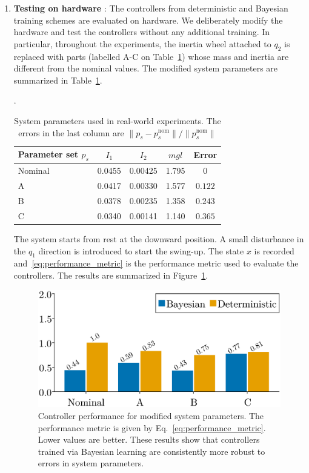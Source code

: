 \begin{enumerate}
    \item \textbf{Testing on hardware} :  
    The controllers from deterministic and Bayesian training schemes are
    evaluated on hardware. 
    We deliberately modify the hardware and test the controllers without any
    additional training.
    In particular, throughout the experiments, the inertia wheel attached to $q_2$
    is replaced with parts (labelled A-C on Table~\ref{tab:modified_params}) whose
    mass and inertia are different from the nominal values.
    The modified system parameters are summarized in
    Table~\ref{tab:modified_params}.
    \begin{table}[tb]
      \centering
      \caption{System parameters used in real-world experiments. The errors in the
      last column are $\|p_s - p^{\textrm{nom}}_{s}\| / \|p^{\textrm{nom}}_{s}\|$}.
      \begin{tabular}{lcccc}
        \toprule
        Parameter set $p_s$ & $I_1$ & $I_2$ & $mgl$ & Error \\
        \midrule
        Nominal & 0.0455 & 0.00425 & 1.795 & 0 \\
        A & 0.0417 & 0.00330 & 1.577 & $0.122$ \\
        B & 0.0378 & 0.00235 & 1.358 & $0.243$ \\
        C & 0.0340 & 0.00141 & 1.140 & $0.365$ \\
        \bottomrule
      \end{tabular}
      \label{tab:modified_params}
    \end{table}
     
    The system starts from rest at the downward position. 
    A small disturbance in the $q_1$ direction is introduced to start the swing-up.
    The state $x$ is recorded and~\eqref{eq:performance_metric} is the
    performance metric used to evaluate the controllers. The results are
    summarized in Figure~\ref{fig:neuralpbc_bar_plot}.
    \begin{figure}[t]
        \centering
        \includegraphics[width=0.6\linewidth]{./figures/pbc_bar.eps}
        \caption{
            Controller performance for modified system parameters. 
            The performance metric is given by
            Eq.~\eqref{eq:performance_metric}.
            Lower values are better. 
            These results show that controllers trained via Bayesian learning are
            consistently more robust to errors in system parameters.
        }
        \label{fig:neuralpbc_bar_plot}
    \end{figure}
    

\end{enumerate}
